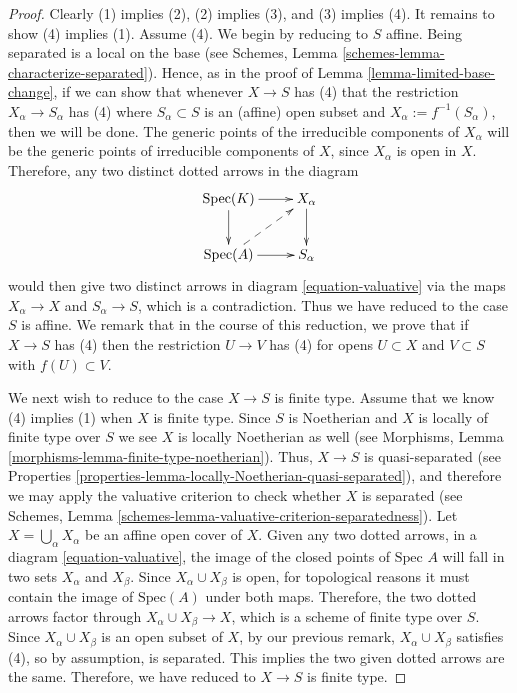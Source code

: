 \begin{proof}
Clearly (1) implies (2), (2) implies (3), and (3) implies (4).  It
remains to show (4) implies (1). Assume (4).
We begin by reducing to $S$ affine.  Being separated is a local
on the base (see
Schemes, Lemma \ref{schemes-lemma-characterize-separated}).
Hence, as in the proof of Lemma
\ref{lemma-limited-base-change}, if we can show that whenever 
$X \to S$ has (4) that the restriction $X_\alpha \to S_\alpha$ has (4)
where $S_\alpha \subset S$ is an (affine) open subset and $X_\alpha :=
f^{-1}(S_\alpha)$, then we will be done.  The
generic points of the irreducible components of $X_\alpha$ will be the
generic points of irreducible components of $X$, since $X_\alpha$ is
open in $X$.  Therefore, any two distinct dotted arrows in the diagram
\begin{equation}
\xymatrix{
\text{Spec}(K) \ar[r] \ar[d] & X_\alpha \ar[d] \\
\text{Spec}(A) \ar[r] \ar@{-->}[ru] & S_\alpha
}
\end{equation}
would then give two distinct arrows in diagram
\eqref{equation-valuative} via the maps $X_\alpha \to X$ and
$S_\alpha \to S$, which is a contradiction.  Thus we have reduced
to the case $S$ is affine.  We remark that in the course of this
reduction, we prove that if $X \to S$ has (4) then the restriction $U
\to V$ has (4) for opens $U \subset X$ and $V \subset S$ with
$f(U) \subset V$.

\medskip\noindent
We next wish to reduce to the case $X \to S$ is finite type.  Assume
that we know (4) implies (1) when $X$ is finite type. Since
$S$ is Noetherian and $X$ is locally of finite type over $S$
we see $X$ is locally Noetherian as well (see Morphisms,
Lemma \ref{morphisms-lemma-finite-type-noetherian}).
Thus, $X \to S$ is quasi-separated (see
Properties \ref{properties-lemma-locally-Noetherian-quasi-separated}),
and therefore we may apply the valuative criterion to check whether $X$
is separated (see
Schemes, Lemma \ref{schemes-lemma-valuative-criterion-separatedness}).
Let $X = \bigcup_\alpha X_\alpha$ be an affine open
cover of $X$. Given any two dotted arrows, in a diagram
\eqref{equation-valuative}, the image of the closed points of
$\text{Spec } A$ will
fall in two sets $X_\alpha$ and $X_\beta$.  Since $X_\alpha \cup
X_\beta$ is open, for topological reasons it must contain the image of
$\text{Spec}(A)$ under both maps. Therefore, the two dotted arrows factor
through $X_\alpha \cup X_\beta \to X$, which is a scheme of finite type over
$S$. Since $X_\alpha \cup X_\beta$ is an open subset of $X$, by our
previous remark, $X_\alpha \cup X_\beta$ satisfies (4), so by
assumption, is separated.  This implies the two given dotted
arrows are the same. Therefore, we have reduced to $X \to S$ is finite type.  


\end{proof}
